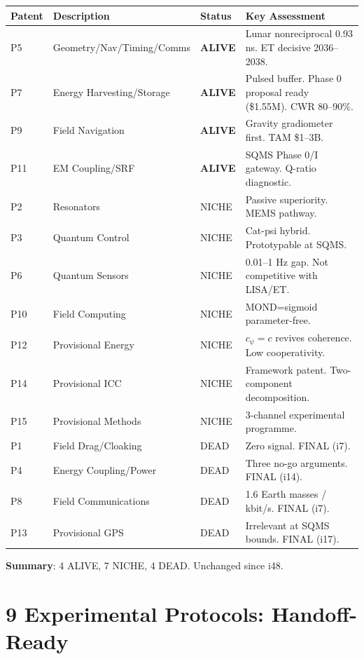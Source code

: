 \documentclass[11pt,a4paper]{article}
\begin{document}
\begin{center}
\begin{longtable}{lllp{6cm}}
\toprule
\textbf{Patent} & \textbf{Description} & \textbf{Status} & \textbf{Key Assessment} \\
\midrule
\endfirsthead
P5 & Geometry/Nav/Timing/Comms & \textbf{ALIVE} & Lunar nonreciprocal 0.93 ns. ET decisive 2036--2038. \\
P7 & Energy Harvesting/Storage & \textbf{ALIVE} & Pulsed buffer. Phase 0 proposal ready (\$1.55M). CWR 80--90\%. \\
P9 & Field Navigation & \textbf{ALIVE} & Gravity gradiometer first. TAM \$1--3B. \\
P11 & EM Coupling/SRF & \textbf{ALIVE} & SQMS Phase 0/I gateway. Q-ratio diagnostic. \\
\midrule
P2 & Resonators & NICHE & Passive superiority. MEMS pathway. \\
P3 & Quantum Control & NICHE & Cat-psi hybrid. Prototypable at SQMS. \\
P6 & Quantum Sensors & NICHE & 0.01--1 Hz gap. Not competitive with LISA/ET. \\
P10 & Field Computing & NICHE & MOND=sigmoid parameter-free. \\
P12 & Provisional Energy & NICHE & $c_\psi = c$ revives coherence. Low cooperativity. \\
P14 & Provisional ICC & NICHE & Framework patent. Two-component decomposition. \\
P15 & Provisional Methods & NICHE & 3-channel experimental programme. \\
\midrule
P1 & Field Drag/Cloaking & DEAD & Zero signal. FINAL (i7). \\
P4 & Energy Coupling/Power & DEAD & Three no-go arguments. FINAL (i14). \\
P8 & Field Communications & DEAD & 1.6 Earth masses / kbit/s. FINAL (i7). \\
P13 & Provisional GPS & DEAD & Irrelevant at SQMS bounds. FINAL (i17). \\
\bottomrule
\end{longtable}
\end{center}

\textbf{Summary}: 4 ALIVE, 7 NICHE, 4 DEAD. Unchanged since i48.


\part{9 Experimental Protocols: Handoff-Ready}
\label{part:experimental}
\end{document}
